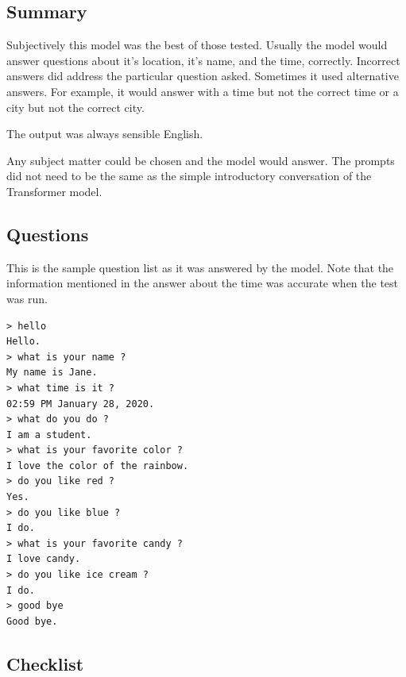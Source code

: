 \subsection{Summary}

Subjectively this model was the best of those tested. Usually the model would answer questions about it's location, it's name, and the time, correctly. %
Incorrect answers did address the particular question asked. Sometimes it used alternative answers. For example, it would answer with a time but not the correct time or a city but not the correct city.  %

The output was always sensible English. 
 
Any subject matter could be chosen and the model would answer. The prompts did not need to be the same as the simple introductory conversation of the Transformer model. 

\subsection{Questions}
This is the sample question list as it was answered by the model. Note that the information mentioned in the answer about the time was accurate when the test was run.

\begin{verbatim}
> hello
Hello.
> what is your name ?
My name is Jane.
> what time is it ?
02:59 PM January 28, 2020.
> what do you do ?
I am a student.
> what is your favorite color ?
I love the color of the rainbow.
> do you like red ?
Yes.
> do you like blue ?
I do.
> what is your favorite candy ?
I love candy.
> do you like ice cream ?
I do. 
> good bye
Good bye.
\end{verbatim}


\subsection{Checklist}

